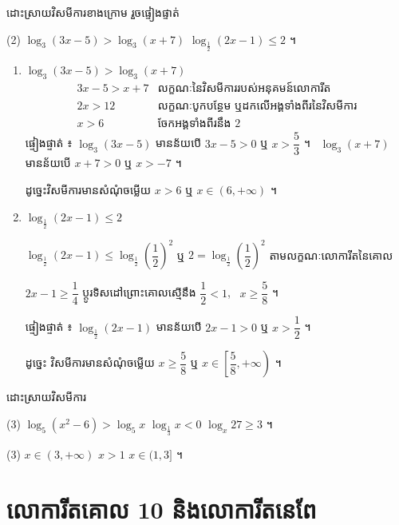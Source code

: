 \begin{example}[លំហាត់គំរូ ៣]
ដោះស្រាយវិសមីការខាងក្រោម រួចផ្ទៀងផ្ទាត់
\begin{tasks}(2)
  \task $\log_3(3x - 5) > \log_3(x + 7)$
  \task $\log_{\frac{1}{2}}(2x - 1) \le 2$ ។
\end{tasks}
\end{example}
\ans
\begin{enumerate}[a]
  \item $\log_3(3x - 5) > \log_3(x + 7)$
  \[
  \begin{array}{ll}
  3x - 5 > x + 7 & \text{លក្ខណៈនៃវិសមីការរបស់អនុគមន៍លោការីត}\\
  2x > 12 & \text{លក្ខណៈបូកបន្ថែម ឬដកលើអង្គទាំងពីរនៃវិសមីការ}\\
  x > 6 & \text{ចែកអង្គទាំងពីរនឹង } 2
  \end{array}
  \]
  ផ្ទៀងផ្ទាត់ ៖ $\log_3(3x - 5)$ មានន័យបើ $3x - 5 > 0$ ឬ $x > \dfrac{5}{3}$ ។ \ $\log_3(x + 7)$ មានន័យបើ $x + 7 > 0$ ឬ $x > -7$ ។

  ដូច្នេះវិសមីការមានសំណុំចម្លើយ $x > 6$ ឬ $x \in (6, +\infty)$ ។
  \item $\log_{\frac{1}{2}}(2x - 1) \le 2$

  $\log_{\frac{1}{2}}(2x - 1) \le \log_{\frac{1}{2}}\left(\dfrac{1}{2}\right)^2$ ឬ $2 = \log_{\frac{1}{2}}\left(\dfrac{1}{2}\right)^2$ តាមលក្ខណៈលោការីតនៃគោល

  $2x - 1 \ge \dfrac{1}{4}$ ប្តូរទិសដៅព្រោះគោលស្មើនឹង $\dfrac{1}{2} < 1$, \ $x \ge \dfrac{5}{8}$ ។

  ផ្ទៀងផ្ទាត់ ៖ $\log_{\frac{1}{2}}(2x - 1)$ មានន័យបើ $2x - 1 > 0$ ឬ $x > \dfrac{1}{2}$ ។

  ដូច្នេះ វិសមីការមានសំណុំចម្លើយ $x \ge \dfrac{5}{8}$ ឬ $x \in \left[\dfrac{5}{8}, +\infty\right)$ ។
\end{enumerate}

\begin{pro}
ដោះស្រាយវិសមីការ
\begin{tasks}(3)
  \task $\log_5(x^2 - 6) > \log_5 x$
  \task $\log_{\frac{1}{3}} x < 0$
  \task $\log_x 27 \ge 3$ ។
\end{tasks}
\ans
\begin{tasks}(3)
  \task $x \in (3, +\infty)$
  \task $x > 1$
  \task $x \in (1, 3]$ ។
\end{tasks}
\end{pro}

\section{លោការីតគោល 10 និងលោការីតនេពែ}


